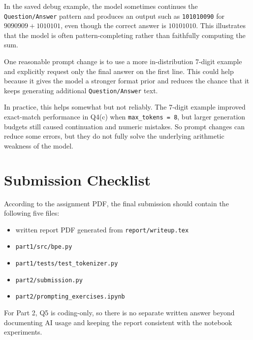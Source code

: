 \documentclass[11pt]{article}
\begin{document}
In the saved debug example, the model sometimes continues the \texttt{Question/Answer} pattern and produces an output such as \texttt{101010090} for \(9090909+1010101\), even though the correct answer is \(10101010\). This illustrates that the model is often pattern-completing rather than faithfully computing the sum.

One reasonable prompt change is to use a more in-distribution 7-digit example and explicitly request only the final answer on the first line. This could help because it gives the model a stronger format prior and reduces the chance that it keeps generating additional \texttt{Question/Answer} text.

In practice, this helps somewhat but not reliably. The 7-digit example improved exact-match performance in Q4(c) when \texttt{max\_tokens = 8}, but larger generation budgets still caused continuation and numeric mistakes. So prompt changes can reduce some errors, but they do not fully solve the underlying arithmetic weakness of the model.

\section*{Submission Checklist}

According to the assignment PDF, the final submission should contain the following five files:
\begin{itemize}
    \item written report PDF generated from \texttt{report/writeup.tex}
    \item \texttt{part1/src/bpe.py}
    \item \texttt{part1/tests/test\_tokenizer.py}
    \item \texttt{part2/submission.py}
    \item \texttt{part2/prompting\_exercises.ipynb}
\end{itemize}

For Part 2, Q5 is coding-only, so there is no separate written answer beyond documenting AI usage and keeping the report consistent with the notebook experiments.
\end{document}
